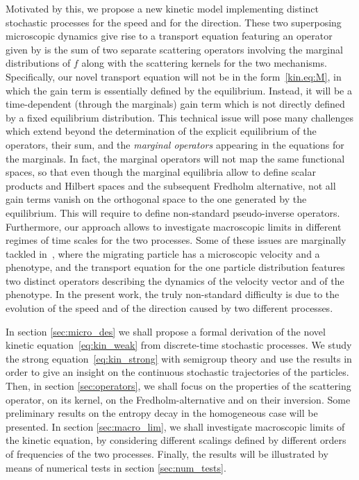 \documentclass[a4paper]{article}
\theoremstyle{Theorem}\newtheorem{proposition}{Proposition}[section]
\theoremstyle{Remark}\newtheorem{remark}{Remark}[section]
\theoremstyle{Theorem}\newtheorem{theorem}{Theorem}[section]
\begin{document}
Motivated by this, we propose a new kinetic model implementing distinct stochastic processes for the speed and for the direction. These two superposing microscopic dynamics give rise to a transport equation featuring an operator given by is the sum of two separate scattering operators involving the marginal distributions of $f$ along with the scattering kernels for the two mechanisms. Specifically, our novel transport equation will not be in the form~\eqref{kin.eq:M}, in which the gain term is essentially defined by the equilibrium. Instead, it will be a time-dependent (through the marginals) gain term which is not directly defined by a fixed equilibrium distribution. This technical issue will pose many challenges which extend beyond the determination of the explicit equilibrium of the operators, their sum, and the \textit{marginal operators} appearing in the equations for the marginals. In fact, the marginal operators will not map the same functional spaces, so that even though the marginal equilibria allow to define scalar products and Hilbert spaces and the subsequent Fredholm alternative, not all gain terms vanish on the orthogonal space to the one generated by the equilibrium. This will require to define non-standard pseudo-inverse operators. Furthermore, our approach allows to investigate macroscopic limits in different regimes of time scales for the two processes. Some of these issues are marginally tackled in~\cite{lorenzi2025}, where the migrating particle has a microscopic velocity and a phenotype, and the transport equation for the one particle distribution features two distinct operators describing the dynamics of the velocity vector and of the phenotype. In the present work, the truly non-standard difficulty is due to the evolution of the speed and of the direction caused by two different processes.



In section \ref{sec:micro_des} we shall propose a formal derivation of the novel kinetic equation~\eqref{eq:kin_weak} from discrete-time stochastic processes. We study the strong equation~\eqref{eq:kin_strong} with semigroup theory and use the results in order to give an insight on the continuous stochastic trajectories of the particles. Then, in section \ref{sec:operators}, we shall focus on the properties of the scattering operator, on its kernel, on the Fredholm-alternative and on their inversion. Some preliminary results on the entropy decay in the homogeneous case will be presented. In section \ref{sec:macro_lim}, we shall investigate macroscopic limits of the kinetic equation, by considering different scalings defined by different orders of frequencies of the two processes. Finally, the results will be illustrated by means of numerical tests in section \ref{sec:num_tests}.  
\end{document}
